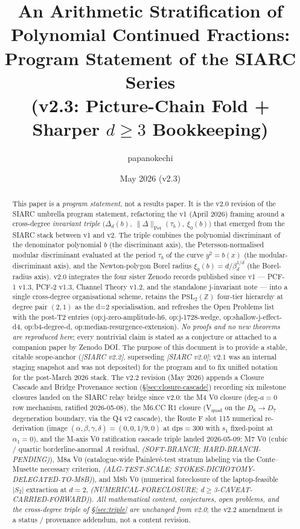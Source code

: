 \documentclass[11pt,a4paper]{article}
\title{An Arithmetic Stratification of Polynomial Continued Fractions:\\
       Program Statement of the SIARC Series\\
       \large (v2.3: Picture-Chain Fold + Sharper $d\geq 3$ Bookkeeping)}
\author{papanokechi}
\date{May 2026 (v2.3)}
\theoremstyle{definition}
\theoremstyle{remark}
\newcommand{\PSLZ}{\mathrm{PSL}_2(\mathbb{Z})}
\newcommand{\PetN}[1]{\lVert #1 \rVert_{\mathrm{Pet}}}
\begin{document}
\maketitle

\begin{abstract}
This paper is a \emph{program statement}, not a results paper. It is the
v2.0 revision of the SIARC umbrella program statement, refactoring the
v1 (April 2026) framing around a cross-degree \emph{invariant triple}
\(\bigl(\Delta_d(b),\ \PetN{\Delta}(\tau_b),\ \xi_0(b)\bigr)\) that
emerged from the SIARC stack between v1 and v2. The triple combines
the polynomial discriminant of the denominator polynomial \(b\) (the
discriminant axis), the Petersson-normalised modular discriminant
evaluated at the period \(\tau_b\) of the curve \(y^2 = b(x)\) (the
modular-discriminant axis), and the Newton-polygon Borel radius
\(\xi_0(b) = d/\beta_d^{1/d}\) (the Borel-radius axis). v2.0 integrates
the four sister Zenodo records published since v1 --- PCF-1 v1.3,
PCF-2 v1.3, Channel Theory v1.2, and the standalone j-invariant
note --- into a single cross-degree organisational scheme, retains the
$\PSLZ$ four-tier hierarchy at degree pair \((2,1)\) as the d=2
specialisation, and refreshes the Open Problems list with the
post-T2 entries (\textsf{op:j-zero-amplitude-h6},
\textsf{op:j-1728-wedge}, \textsf{op:shallow-j-effect-d4},
\textsf{op:b4-degree-d}, \textsf{op:median-resurgence-extension}).
\emph{No proofs and no new theorems are reproduced here}; every
nontrivial claim is stated as a conjecture or attached to a companion
paper by Zenodo DOI. The purpose of this document is to provide a
stable, citable scope-anchor (\emph{[SIARC v2.2]}, superseding
\emph{[SIARC v2.0]}; v2.1 was an internal staging snapshot and was
not deposited) for the program and to fix unified notation for
the post-March 2026 stack. The v2.2 revision (May 2026) appends a
Closure Cascade and Bridge Provenance section
(\S\ref{sec:closure-cascade}) recording six milestone closures landed
on the SIARC relay bridge since v2.0: the M4 V0 closure (deg-$a=0$ row
mechanism, ratified 2026-05-08), the M6.CC R1 closure (V$_{\mathrm{quad}}$
on the $D_6 \to D_7$ degeneration boundary, via the Q4 v2 cascade),
the Route F slot 115 numerical re-derivation (image
$(\alpha,\beta,\gamma,\delta) = (0,0,1/9,0)$ at $\mathrm{dps}=300$ with
$s_1$ fixed-point at $\alpha_1 = 0$), and the M-axis V0 ratification
cascade triple landed 2026-05-09: M7 V0 (cubic / quartic borderline-anormal $A$ residual,
\emph{(SOFT-BRANCH; HARD-BRANCH-PENDING)}), M8a V0 (catalogue-wide
Painlev\'e-test stratum labeling via the Conte--Musette necessary
criterion, \emph{(ALG-TEST-SCALE; STOKES-DICHOTOMY-DELEGATED-TO-M8B)}),
and M8b V0 (numerical foreclosure of the laptop-feasible $|S_2|$
extraction at $d=2$, \emph{(NUMERICAL-FORECLOSURE; d$\geq$3-CAVEAT-CARRIED-FORWARD)}).
\emph{All mathematical content, conjectures, open problems, and the
cross-degree triple of \S\ref{sec:triple} are unchanged from v2.0};
the v2.2 amendment is a status / provenance addendum, not a content
revision.


\end{abstract}
\end{document}
